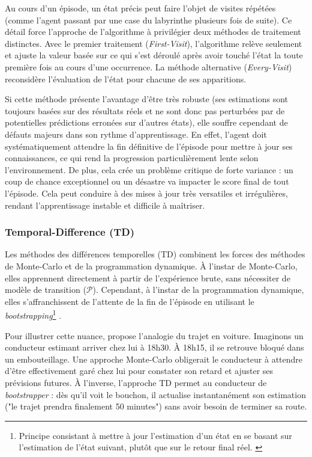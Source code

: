 Au cours d'un épisode, un état précis peut faire l'objet de visites répétées (comme l'agent passant par une case du labyrinthe plusieurs fois de suite). Ce détail force l'approche de l'algorithme à privilégier deux méthodes de traitement distinctes. Avec le premier traitement (\textit{First-Visit}), l'algorithme relève seulement et ajuste la valeur basée sur ce qui s'est déroulé après avoir touché l'état la toute première fois au cours d'une occurrence. La méthode alternative (\textit{Every-Visit}) reconsidère l'évaluation de l'état pour chacune de ses apparitions.

Si cette méthode présente l'avantage d'être très robuste (ses estimations sont toujours basées sur des résultats réels et ne sont donc pas perturbées par de potentielles prédictions erronées sur d'autres états), elle souffre cependant de défauts majeurs dans son rythme d'apprentissage. En effet, l'agent doit systématiquement attendre la fin définitive de l'épisode pour mettre à jour ses connaissances, ce qui rend la progression particulièrement lente selon l'environnement. De plus, cela crée un problème critique de forte variance : un coup de chance exceptionnel ou un désastre va impacter le score final de tout l'épisode. Cela peut conduire à des mises à jour très versatiles et irrégulières, rendant l'apprentissage instable et difficile à maîtriser.

\subsubsection{Temporal-Difference (TD)}
\label{sec:td}

Les méthodes des différences temporelles (TD) combinent les forces des méthodes de Monte-Carlo et de la programmation dynamique. À l'instar de Monte-Carlo, elles apprennent directement à partir de l'expérience brute, sans nécessiter de modèle de transition ($\mathcal{P}$). Cependant, à l'instar de la programmation dynamique, elles s'affranchissent de l'attente de la fin de l'épisode en utilisant le \textit{bootstrapping}\footnote{Principe consistant à mettre à jour l'estimation d'un état en se basant sur l'estimation de l'état suivant, plutôt que sur le retour final réel. \parencite{suttonReinforcementLearningIntroduction2018}} \parencite{suttonReinforcementLearningIntroduction2018}.

Pour illustrer cette nuance, \textcite{silverLecturesReinforcementLearning2015} propose l'analogie du trajet en voiture. Imaginons un conducteur estimant arriver chez lui à 18h30. À 18h15, il se retrouve bloqué dans un embouteillage. Une approche Monte-Carlo obligerait le conducteur à attendre d'être effectivement garé chez lui pour constater son retard et ajuster ses prévisions futures. À l'inverse, l'approche TD permet au conducteur de \textit{bootstrapper} : dès qu'il voit le bouchon, il actualise instantanément son estimation ("le trajet prendra finalement 50 minutes") sans avoir besoin de terminer sa route.

